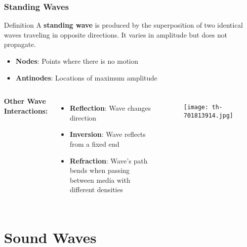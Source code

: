 \documentclass{beamer}
\begin{document}
\begin{frame}
\frametitle{Standing Waves}
\begin{block}{Definition}
A \textbf{standing wave} is produced by the superposition of two identical waves traveling in opposite directions. It varies in amplitude but does not propagate.
\end{block}

\begin{itemize}
\item \textbf{Nodes}: Points where there is no motion
\item \textbf{Antinodes}: Locations of maximum amplitude
\end{itemize}

\begin{columns}
\textbf{Other Wave Interactions:}
\begin{itemize}
\item \textbf{Reflection}: Wave changes direction
\item \textbf{Inversion}: Wave reflects from a fixed end
\item \textbf{Refraction}: Wave's path bends when passing between media with different densities
\end{itemize}

\begin{figure}
    \centering
    \texttt{[image: th-701813914.jpg]}
\end{figure}
\end{columns}
\end{frame}

\section{Sound Waves}
\end{document}
